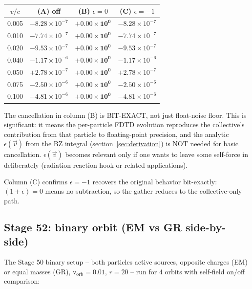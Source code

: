 \documentclass[11pt,a4paper]{article}
\begin{document}
\begin{center}
\begin{tabular}{cccc}
\toprule
$v/c$ & (A) off & (B) $\epsilon=0$ & (C) $\epsilon=-1$ \\
\midrule
0.005 & $-8.28\times 10^{-7}$ & $\mathbf{+0.00\times 10^{0}}$ & $-8.28\times 10^{-7}$ \\
0.010 & $-7.74\times 10^{-7}$ & $\mathbf{+0.00\times 10^{0}}$ & $-7.74\times 10^{-7}$ \\
0.020 & $-9.53\times 10^{-7}$ & $\mathbf{+0.00\times 10^{0}}$ & $-9.53\times 10^{-7}$ \\
0.040 & $-1.17\times 10^{-6}$ & $\mathbf{+0.00\times 10^{0}}$ & $-1.17\times 10^{-6}$ \\
0.050 & $+2.78\times 10^{-7}$ & $\mathbf{+0.00\times 10^{0}}$ & $+2.78\times 10^{-7}$ \\
0.075 & $-2.50\times 10^{-6}$ & $\mathbf{+0.00\times 10^{0}}$ & $-2.50\times 10^{-6}$ \\
0.100 & $-4.81\times 10^{-6}$ & $\mathbf{+0.00\times 10^{0}}$ & $-4.81\times 10^{-6}$ \\
\bottomrule
\end{tabular}
\end{center}

The cancellation in column (B) is BIT-EXACT, not just float-noise
floor.  This is significant: it means the per-particle FDTD evolution
reproduces the collective's contribution from that particle to
floating-point precision, and the analytic $\epsilon(\vec v)$ from
the BZ integral (section~\ref{sec:derivation}) is NOT needed for
basic cancellation.  $\epsilon(\vec v)$ becomes relevant only if one
wants to leave some self-force in deliberately (radiation reaction
hook or related applications).

Column (C) confirms $\epsilon = -1$ recovers the original behavior
bit-exactly: $(1 + \epsilon) = 0$ means no subtraction, so the gather
reduces to the collective-only path.

\subsection{Stage 52: binary orbit (EM vs GR side-by-side)}

The Stage 50 binary setup -- both particles active sources, opposite
charges (EM) or equal masses (GR), v$_{\mathrm{orb}} = 0.01$, $r=20$
-- run for 4 orbits with self-field on/off comparison:
\end{document}
